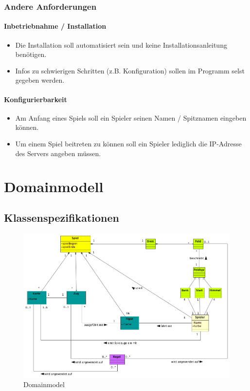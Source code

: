 \documentclass[a4paper,12pt,halfparskip,DIV14]{scrartcl}
\begin{document}
\subsubsection{Andere Anforderungen}\label{ssub:andere_anforderungen} %
\paragraph{Inbetriebnahme / Installation}\label{ssub:inbetriebnahme_installation} %
\begin{itemize}
	\item Die Installation soll automatisiert sein und keine Installationsanleitung benötigen.
	\item Infos zu schwierigen Schritten (z.B. Konfiguration) sollen im Programm selst gegeben werden.
\end{itemize}
\paragraph{Konfigurierbarkeit}\label{ssub:konfigurierbarkeit} %
\begin{itemize}
	\item Am Anfang eines Spiels soll ein Spieler seinen Namen / Spitznamen eingeben können.
	\item Um einem Spiel beitreten zu können soll ein Spieler lediglich die IP-Adresse des Servers angeben müssen.
\end{itemize}


\section{Domainmodell}\label{cha:domainmodell} %
\subsection{Klassenspezifikationen}\label{sub:klassenspezifikationen} %
\begin{figure}
	[htp] \centering 
	\includegraphics[width=1\textwidth]{DomainModel.png} \caption{Domainmodel}\label{fig:DomainModel.png} 
\end{figure}
\end{document}
